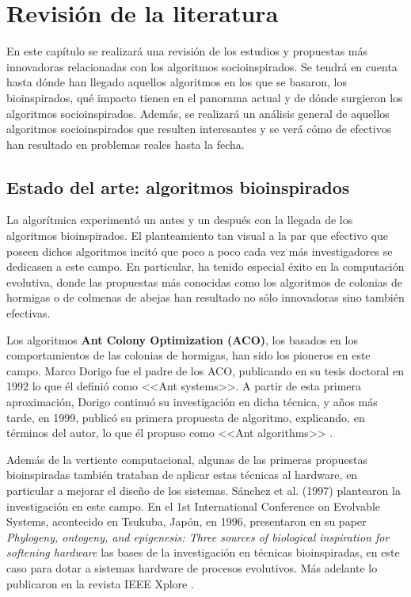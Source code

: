 \chapter{Revisión de la literatura}

En este capítulo se realizará una revisión de los estudios y propuestas más innovadoras relacionadas con los algoritmos socioinspirados. Se tendrá en cuenta hasta dónde han llegado aquellos algoritmos en los que se basaron, los bioinspirados, qué impacto tienen en el panorama actual y de dónde surgieron los algoritmos socioinspirados. Además, se realizará un análisis general de aquellos algoritmos socioinspirados que resulten interesantes y se verá cómo de efectivos han resultado en problemas reales hasta la fecha.

\section{Estado del arte: algoritmos bioinspirados}

La algorítmica experimentó un antes y un después con la llegada de los algoritmos bioinspirados. El planteamiento tan visual a la par que efectivo que poseen dichos algoritmos incitó que poco a poco cada vez más investigadores se dedicasen a este campo. En particular, ha tenido especial éxito en la computación evolutiva, donde las propuestas más conocidas como los algoritmos de colonias de hormigas o de colmenas de abejas han resultado no sólo innovadoras sino también efectivas.

Los algoritmos \textbf{Ant Colony Optimization (ACO)}, los basados en los comportamientos de las colonias de hormigas, han sido los pioneros en este campo. Marco Dorigo fue el padre de los ACO, publicando en su tesis doctoral \cite{dorigo-thesis} en 1992 lo que él definió como <<Ant systems>>. A partir de esta primera aproximación, Dorigo continuó su investigación en dicha técnica, y años más tarde, en 1999, publicó su primera propuesta de algoritmo, explicando, en términos del autor, lo que él propuso como <<Ant algorithms>> \cite{ant-algorithms-dorigo}.

Además de la vertiente computacional, algunas de las primeras propuestas bioinspiradas también trataban de aplicar estas técnicas al hardware, en particular a mejorar el diseño de los sistemas. Sánchez et al. (1997) plantearon la investigación en este campo. En el 1st International Conference on Evolvable Systems, acontecido en Tsukuba, Japón, en 1996, presentaron en su paper \textit{Phylogeny, ontogeny, and epigenesis: Three sources of biological inspiration for softening hardware} \cite{bioinspired-systems-paper} las bases de la investigación en técnicas bioinspiradas, en este caso para dotar a sistemas hardware de procesos evolutivos. Más adelante lo publicaron en la revista IEEE Xplore \cite{bioinspired-systems-article}.


